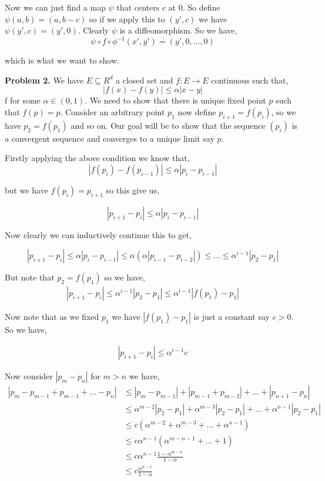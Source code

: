 \documentclass[a4paper]{article}
\begin{document}
Now we can just find a map $\psi$ that centers $c$ at $0$. So define $\psi(a, b) = (a, b - c)$ so if we apply this to $(y', c)$ we have $\psi(y', c) = (y', 0)$. Clearly $\psi$ is a diffeomorphism. So we have, 
\[
    \psi \circ f \circ \phi^{-1}(x', y') = (y', 0, \dots ,0)
\]


which is what we want to show.

\textbf{Problem 2.}
We have $E \subseteq R^{d}$ a closed set and $f:E \to E$ continuous such that, 
\[
  |f(x) - f(y)| \le \alpha | x- y|
\]
f
for some $\alpha \in (0, 1)$. We need to show that there is unique fixed point $p$ such that $f(p) = p$. Consider an arbitrary point $p_{1}$ now define $p_{i + 1} = f(p_{i})$, so we have $p_{2} = f(p_{1})$ and so on. Our goal will be to show that the sequence $(p_i)$ is a convergent sequence and converges to a unique limit say $p$.

\vspace{1em}

Firstly applying the above condition we know that,
\[
  |f(p_{i}) - f(p_{i - 1})| \le \alpha |p_{i} - p_{i - 1}|
\]

but we have $f(p_{i}) = p_{i + 1}$ so this give us,

\[
  | p_{i + 1} - p_{i}| \le \alpha |p_{i} - p_{i - 1}|
\]

Now clearly we can inductively continue this to get, 

\[
  | p_{i + 1} - p_{i}| \le \alpha |p_{i} - p_{i - 1}| \le  \alpha (\alpha |p_{i - 1} - p_{i - 2}|) \le \dots  \le \alpha^{i - 1} |p_2 - p_1|
\]

But note that $p_{2} = f(p_{1})$ so we have,
\begin{align*}
  |p_{i + 1} - p_i| \le \alpha^{i - 1}|p_{2} - p_{1}| \le  \alpha^{i - 1}|f(p_{1}) - p_{1}|
\end{align*}

Now note that as we fixed $p_{1}$ we have $|f(p_{1}) - p_{1}|$ is just a constant say $c > 0$. So we have,

\begin{align*}
  |p_{i + 1} - p_i|\le  \alpha^{i - 1} c
\end{align*}

Now consider $|p_m - p_n|$ for $m > n$ we have, 
\begin{align*}
  |p_m - p_{m - 1} + p_{m - 1} + \dots - p_n| &\le |p_m - p_{m - 1}| + |p_{m - 1} + p_{m - 2}|+\dots+|p_{n + 1} - p_n|\\
 &\le  \alpha^{m - 2}|p_{2} - p_{1}| + \alpha^{m - 3}|p_{2} - p_{1}|+\dots+\alpha^{n - 1}|p_{2} - p_{1}|\\
 &\le  c (\alpha^{m - 2} + \alpha^{m - 3}+\dots+\alpha^{n - 1})\\
 &\le c \alpha^{n - 1} (\alpha^{m -  n - 1} + \dots + 1)\\
 &\le c  \alpha^{n - 1} \frac{1 - \alpha^{m - n}}{1 - \alpha}\\
 &\le  c\frac{\alpha^{n - 1}}{1 - \alpha}\\
\end{align*}
\end{document}
